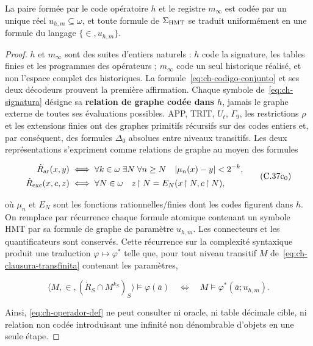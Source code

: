 \begin{lemma}
\label{thm:ch-6}
La paire formée par
le code opératoire \(h\) et le registre \(m_\infty\) est codée par un unique
réel \(u_{h,m}\subseteq\omega\), et toute formule de \(\Sigma_{\rm HMT}\) se
traduit uniformément en une formule du langage \(\{\in,u_{h,m}\}\).

\end{lemma}
\begin{proof}
\(h\) et \(m_\infty\) sont des suites d'entiers naturels : \(h\) code la signature, les tables finies et les programmes des opérateurs ; \(m_\infty\) code un seul historique réalisé, et non l'espace complet des historiques. La formule~\eqref{eq:ch-codigo-conjunto} et ses deux décodeurs prouvent la première affirmation. Chaque symbole de~\eqref{eq:ch-signatura} désigne sa \textbf{relation de graphe codée dans \(h\)}, jamais le graphe externe de toutes ses évaluations possibles. APP, TRIT, \(U_t\), \(\Gamma_9\), les restrictions \(\rho\) et les extensions finies ont des graphes primitifs récursifs sur des codes entiers et, par conséquent, des formules \(\Delta_0\) absolues entre niveaux transitifs. Les deux représentations s'expriment comme relations de graphe au moyen des formules

\[
 \begin{aligned}
 \dot R_{\rm ar}(x,y)
 &\;\Longleftrightarrow\;
 \forall k\in\omega\;\exists N\;\forall n\ge N\quad
 |\mu_n(x)-y|<2^{-k},\\
 \dot R_{\rm exc}(x,c,z)
 &\;\Longleftrightarrow\;
 \forall N\in\omega\quad z\!\upharpoonright N
   =E_N(x\!\upharpoonright N,c\!\upharpoonright N),
 \end{aligned}
\tag{C.37c$_0$}\label{eq:ch-grafos-publicacion}
\]

où \(\mu_n\) et \(E_N\) sont les fonctions rationnelles/finies dont les codes
figurent dans \(h\). On remplace par récurrence chaque formule atomique contenant
un symbole HMT par sa formule de graphe de paramètre \(u_{h,m}\). Les
connecteurs et les quantificateurs sont conservés. Cette récurrence sur la complexité
syntaxique produit une traduction \(\varphi\mapsto\varphi^*\) telle que, pour
tout niveau transitif \(M\) de~\eqref{eq:ch-clausura-transfinita} contenant les paramètres,

\[
 \langle M,\in,(\dot R_S\cap M^{k_S})_S\rangle
   \models\varphi(\bar a)
 \quad\Longleftrightarrow\quad
 M\models\varphi^*(\bar a;u_{h,m}).
\tag{C.37c}\label{eq:ch-eliminacion-uniforme}
\]

Ainsi, \eqref{eq:ch-operador-def} ne peut consulter ni oracle, ni table décimale cible, ni relation non codée introduisant une infinité non dénombrable d'objets en une seule étape.
\end{proof}

